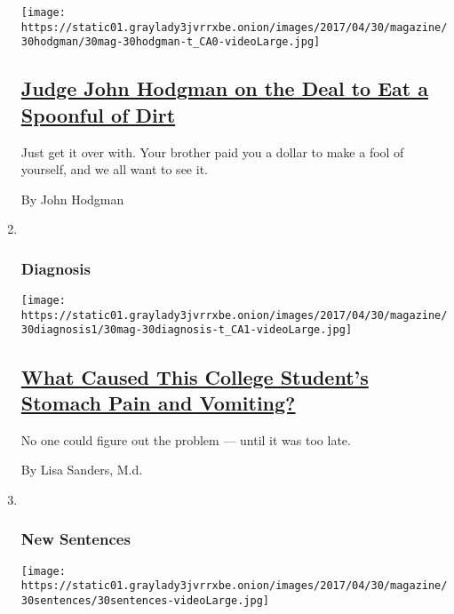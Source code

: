 \begin{enumerate}
  \texttt{[image: https://static01.graylady3jvrrxbe.onion/images/2017/04/30/magazine/30hodgman/30mag-30hodgman-t\_CA0-videoLarge.jpg]}

  \hypertarget{judge-john-hodgman-on-the-deal-to-eat-a-spoonful-of-dirt}{%
  \subsection{\texorpdfstring{\href{/2017/04/28/magazine/judge-john-hodgman-on-the-deal-to-eat-a-spoonful-of-dirt.html}{Judge
  John Hodgman on the Deal to Eat a Spoonful of
  Dirt}}{Judge John Hodgman on the Deal to Eat a Spoonful of Dirt}}\label{judge-john-hodgman-on-the-deal-to-eat-a-spoonful-of-dirt}}

  Just get it over with. Your brother paid you a dollar to make a fool
  of yourself, and we all want to see it.

  By John Hodgman
\item ~
  \hypertarget{diagnosis}{%
  \subsubsection{Diagnosis}\label{diagnosis}}

  \texttt{[image: https://static01.graylady3jvrrxbe.onion/images/2017/04/30/magazine/30diagnosis1/30mag-30diagnosis-t\_CA1-videoLarge.jpg]}

  \hypertarget{what-caused-this-college-students-stomach-pain-and-vomiting}{%
  \subsection{\texorpdfstring{\href{/2017/04/27/magazine/what-caused-this-college-students-stomach-pain-and-vomiting.html}{What
  Caused This College Student's Stomach Pain and
  Vomiting?}}{What Caused This College Student's Stomach Pain and Vomiting?}}\label{what-caused-this-college-students-stomach-pain-and-vomiting}}

  No one could figure out the problem --- until it was too late.

  By Lisa Sanders, M.d.
\item ~
  \hypertarget{new-sentences}{%
  \subsubsection{New Sentences}\label{new-sentences}}

  \texttt{[image: https://static01.graylady3jvrrxbe.onion/images/2017/04/30/magazine/30sentences/30sentences-videoLarge.jpg]}


\end{enumerate}
